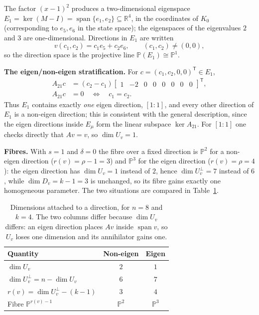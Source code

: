 The factor $(x-1)^2$ produces a two-dimensional eigenspace
$E_1=\ker(M-I)=\operatorname{span}\{e_1,e_2\}\subseteq\mathbb{R}^{4}$, in the coordinates of $K_0$
(corresponding to $e_5,e_6$ in the state space); the eigenspaces of the eigenvalues $2$ and $3$ are
one-dimensional. Directions in $E_1$ are written
\begin{equation}\label{sec6:eq:v}
v(c_1,c_2)=c_1e_5+c_2e_6,\qquad (c_1,c_2)\neq(0,0),
\end{equation}
so the direction space is the projective line $\mathbb{P}(E_1)\cong\mathbb{P}^{1}$.

\textbf{The eigen/non-eigen stratification.} For $c=(c_1,c_2,0,0)^{\mathsf{T}}\in E_1$,
\begin{equation}\label{sec6:eq:A21c}
\begin{aligned}
A_{21}c&=(c_2-c_1)\begin{bmatrix}1&-2&0&0&0&0&0&0\end{bmatrix}^{\mathsf{T}},\\
A_{21}c&=0\quad\iff\quad c_1=c_2 .
\end{aligned}
\end{equation}
Thus $E_1$ contains exactly \emph{one} eigen direction, $[1\!:\!1]$, and every other direction of $E_1$
is a non-eigen direction; this is consistent with the general description, since the eigen directions
inside $E_\mu$ form the linear subspace $\ker A_{21}$. For $[1\!:\!1]$ one checks directly that $Av=v$,
so $\dim U_v=1$.

\textbf{Fibres.} With $s=1$ and $\delta=0$ the fibre over a fixed direction is $\mathbb{P}^{2}$ for a
non-eigen direction ($r(v)=\rho-1=3$) and $\mathbb{P}^{3}$ for the eigen direction
($r(v)=\rho=4$): the eigen direction has $\dim U_v=1$ instead of $2$, hence $\dim U_v^{\perp}=7$
instead of $6$, while $\dim D_v=k-1=3$ is unchanged, so its fibre gains exactly one homogeneous
parameter. The two situations are compared in Table~\ref{sec6:tab:dims}.

\begin{table}[t]
\centering
\caption{Dimensions attached to a direction, for $n=8$ and $k=4$. The two columns differ because
$\dim U_v$ differs: an eigen direction places $Av$ inside $\operatorname{span}v$, so $U_v$ loses one
dimension and its annihilator gains one.}
\label{sec6:tab:dims}
\begin{tabular}{@{}lcc@{}}
\toprule
Quantity & Non-eigen & Eigen\\
\midrule
$\dim U_v$ & $2$ & $1$\\
$\dim U_v^{\perp}=n-\dim U_v$ & $6$ & $7$\\
$r(v)=\dim U_v^{\perp}-(k-1)$ & $3$ & $4$\\
Fibre $\mathbb{P}^{r(v)-1}$ & $\mathbb{P}^{2}$ & $\mathbb{P}^{3}$\\
\bottomrule
\end{tabular}
\end{table}


